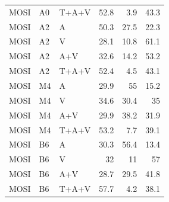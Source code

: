 {\begin{longtable}{lllrrr}
MOSI & A0 & T+A+V & 52.8 & 3.9 & 43.3 \\
MOSI & A2 & A & 50.3 & 27.5 & 22.3 \\
MOSI & A2 & V & 28.1 & 10.8 & 61.1 \\
MOSI & A2 & A+V & 32.6 & 14.2 & 53.2 \\
MOSI & A2 & T+A+V & 52.4 & 4.5 & 43.1 \\
MOSI & M4 & A & 29.9 & 55 & 15.2 \\
MOSI & M4 & V & 34.6 & 30.4 & 35 \\
MOSI & M4 & A+V & 29.9 & 38.2 & 31.9 \\
MOSI & M4 & T+A+V & 53.2 & 7.7 & 39.1 \\
MOSI & B6 & A & 30.3 & 56.4 & 13.4 \\
MOSI & B6 & V & 32 & 11 & 57 \\
MOSI & B6 & A+V & 28.7 & 29.5 & 41.8 \\
MOSI & B6 & T+A+V & 57.7 & 4.2 & 38.1 \\
\end{longtable}
}
